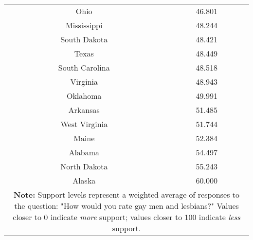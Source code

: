 \begin{spacing}{1}
\begin{longtable}{|c|c|}
Ohio & 46.801\\
Mississippi & 48.244\\
South Dakota & 48.421\\
Texas & 48.449\\
South Carolina & 48.518\\
Virginia & 48.943\\
Oklahoma & 49.991\\
Arkansas & 51.485\\
West Virginia & 51.744\\
Maine & 52.384\\
Alabama & 54.497\\
North Dakota & 55.243\\
Alaska & 60.000\\
\hline
\multicolumn{2}{p{0.8\linewidth}}{\small \textbf{Note:} Support levels represent a weighted average of responses to the question: "How would you rate gay men and lesbians?" Values closer to 0 indicate \textit{more} support; values closer to 100 indicate \textit{less} support.} \\ 
\end{longtable}
\end{spacing}